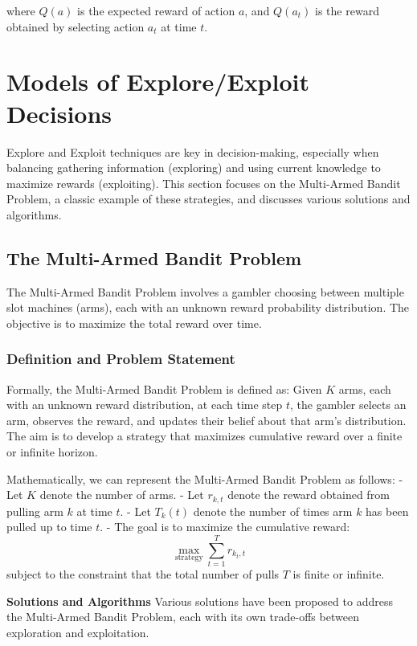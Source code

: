 \documentclass[12pt]{book} %
\begin{document}
where $Q(a)$ is the expected reward of action $a$, and $Q(a_t)$ is the reward obtained by selecting action $a_t$ at time $t$.


\section{Models of Explore/Exploit Decisions}

Explore and Exploit techniques are key in decision-making, especially when balancing gathering information (exploring) and using current knowledge to maximize rewards (exploiting). This section focuses on the Multi-Armed Bandit Problem, a classic example of these strategies, and discusses various solutions and algorithms.

\subsection{The Multi-Armed Bandit Problem}

The Multi-Armed Bandit Problem involves a gambler choosing between multiple slot machines (arms), each with an unknown reward probability distribution. The objective is to maximize the total reward over time.

\subsubsection{Definition and Problem Statement}

Formally, the Multi-Armed Bandit Problem is defined as: Given \(K\) arms, each with an unknown reward distribution, at each time step \(t\), the gambler selects an arm, observes the reward, and updates their belief about that arm's distribution. The aim is to develop a strategy that maximizes cumulative reward over a finite or infinite horizon.


Mathematically, we can represent the Multi-Armed Bandit Problem as follows:
- Let \(K\) denote the number of arms.
- Let \(r_{k,t}\) denote the reward obtained from pulling arm \(k\) at time \(t\).
- Let \(T_k(t)\) denote the number of times arm \(k\) has been pulled up to time \(t\).
- The goal is to maximize the cumulative reward:
\[ \max_{\text{strategy}} \sum_{t=1}^{T} r_{k_t,t} \]
subject to the constraint that the total number of pulls \(T\) is finite or infinite.

\textbf{Solutions and Algorithms}
Various solutions have been proposed to address the Multi-Armed Bandit Problem, each with its own trade-offs between exploration and exploitation.
\end{document}
